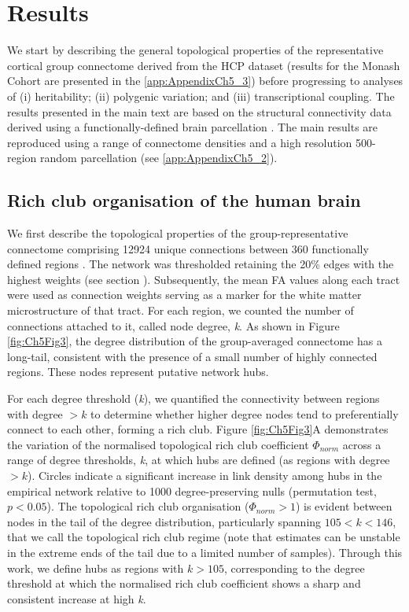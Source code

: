 \section{Results}

We start by describing the general topological properties of the representative cortical group connectome derived from the HCP dataset (results for the Monash Cohort are presented in the \ref{app:AppendixCh5_3}) before progressing to analyses of (i) heritability; (ii) polygenic variation; and (iii) transcriptional coupling. The results presented in the main text are based on the structural connectivity data derived using a functionally-defined brain parcellation \citep{Glasser2016}. The main results are reproduced using a range of connectome densities and a high resolution 500-region random parcellation (see \ref{app:AppendixCh5_2}).

\subsection{Rich club organisation of the human brain}

We first describe the topological properties of the group-representative connectome comprising \num{12924} unique connections between 360 functionally defined regions \citep{Glasser2016}. The network was thresholded retaining the 20\% edges with the highest weights (see section ). Subsequently, the mean FA values along each tract were used as connection weights serving as a marker for the white matter microstructure of that tract. For each region, we counted the number of connections attached to it, called node degree, \textit{k}. As shown in Figure \ref{fig:Ch5Fig3}, the degree distribution of the group-averaged connectome has a long-tail, consistent with the presence of a small number of highly connected regions. These nodes represent putative network hubs.

For each degree threshold (\textit{k}), we quantified the connectivity between regions with degree $> k$ to determine whether higher degree nodes tend to preferentially connect to each other, forming a rich club. Figure \ref{fig:Ch5Fig3}A demonstrates the variation of the normalised topological rich club coefficient $\Phi_{norm}$ across a range of degree thresholds, \textit{k}, at which hubs are defined (as regions with degree $> k$). Circles indicate a significant increase in link density among hubs in the empirical network relative to 1000 degree-preserving nulls (permutation test, $p < 0.05$). The topological rich club organisation ($\Phi_{norm} >1$) is evident between nodes in the tail of the degree distribution, particularly spanning $105< k <146$, that we call the topological rich club regime (note that estimates can be unstable in the extreme ends of the tail due to a limited number of samples). Through this work, we define hubs as regions with $k > 105$, corresponding to the degree threshold at which the normalised rich club coefficient shows a sharp and consistent increase at high \textit{k}.


